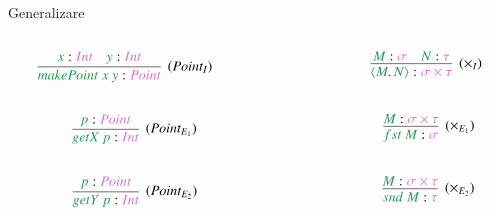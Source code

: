 \documentclass[xcolor=pdftex,romanian,colorlinks]{beamer}
\begin{document}
\begin{frame}{Generalizare}

\begin{columns}
\begin{column}{0.3\textwidth}
\[
\infer[(Point_I)]
	{{\color{True}makePoint\ x\ y} : \sel{Point}}
	{{\color{True}x} : \sel{Int} \quad {\color{True}y} : \sel{Int}}
\]
\end{column}
\begin{column}{0.1\textwidth}
\end{column}
\begin{column}{0.3\textwidth}
\[
\infer[(\times_I)]
	{{\color{True}\langle M,N \rangle} : \sel{\sigma \times \tau}}
	{{\color{True}M} : \sel{\sigma} \quad {\color{True}N} : \sel{\tau}}
\]
\end{column}
\end{columns}

 \vspace{.6cm}

\begin{columns}
\begin{column}{0.3\textwidth}
\[\quad \quad
\infer[(Point_{E_1})]
	{{\color{True}getX\ p} : \sel{Int}}
	{{\color{True}p} : \sel{Point}}
\]
\end{column}
\begin{column}{0.1\textwidth}
\end{column}
\begin{column}{0.3\textwidth}
\[
\infer[(\times_{E_1})]
	{{\color{True}fst\ M} : \sel{\sigma}}
	{{\color{True}M} : \sel{\sigma \times \tau}}
\]
\end{column}
\end{columns}

 \vspace{.6cm}

\begin{columns}
\begin{column}{0.3\textwidth}
\[\quad \quad
\infer[(Point_{E_2})]
	{{\color{True}getY\ p} : \sel{Int}}
	{{\color{True}p} : \sel{Point}}
\]
\end{column}
\begin{column}{0.1\textwidth}
\end{column}
\begin{column}{0.3\textwidth}
\[
\infer[(\times_{E_2})]
	{{\color{True}snd\ M} : \sel{\tau}}
	{{\color{True}M} : \sel{\sigma \times \tau}}
\]
\end{column}

\end{columns}


\end{frame}
\end{document}
